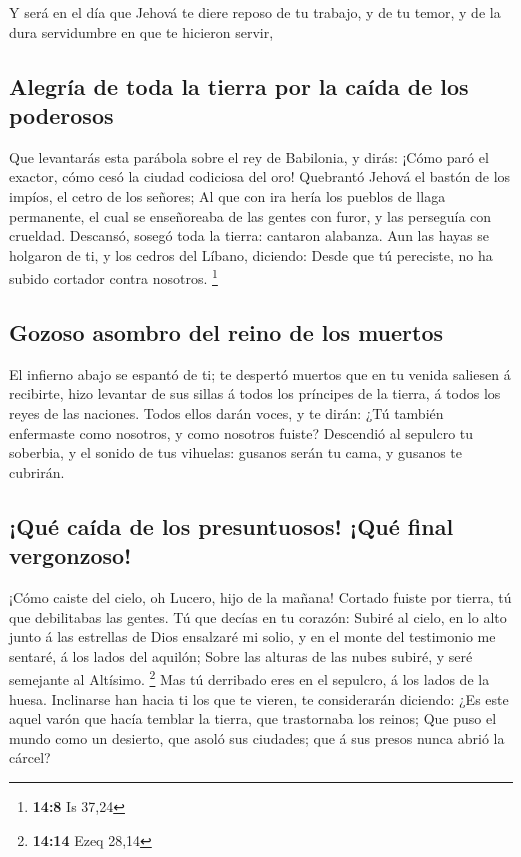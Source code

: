  Y será en el día que Jehová te diere reposo de tu trabajo,
y de tu temor, y de la dura servidumbre en que te hicieron servir,

\hypertarget{alegruxeda-de-toda-la-tierra-por-la-cauxedda-de-los-poderosos}{%
\subsection{Alegría de toda la tierra por la caída de los
poderosos}\label{alegruxeda-de-toda-la-tierra-por-la-cauxedda-de-los-poderosos}}

 Que levantarás esta parábola sobre el rey de Babilonia, y
dirás: ¡Cómo paró el exactor, cómo cesó la ciudad codiciosa del oro!
 Quebrantó Jehová el bastón de los impíos, el cetro de los
señores;  Al que con ira hería los pueblos de llaga
permanente, el cual se enseñoreaba de las gentes con furor, y las
perseguía con crueldad.  Descansó, sosegó toda la tierra:
cantaron alabanza.  Aun las hayas se holgaron de ti, y los
cedros del Líbano, diciendo: Desde que tú pereciste, no ha subido
cortador contra nosotros. \footnote{\textbf{14:8} Is 37,24}

\hypertarget{gozoso-asombro-del-reino-de-los-muertos}{%
\subsection{Gozoso asombro del reino de los
muertos}\label{gozoso-asombro-del-reino-de-los-muertos}}

 El infierno abajo se espantó de ti; te despertó muertos que
en tu venida saliesen á recibirte, hizo levantar de sus sillas á todos
los príncipes de la tierra, á todos los reyes de las naciones.
 Todos ellos darán voces, y te dirán: ¿Tú también
enfermaste como nosotros, y como nosotros fuiste? 
Descendió al sepulcro tu soberbia, y el sonido de tus vihuelas: gusanos
serán tu cama, y gusanos te cubrirán.

\hypertarget{quuxe9-cauxedda-de-los-presuntuosos-quuxe9-final-vergonzoso}{%
\subsection{¡Qué caída de los presuntuosos! ¡Qué final
vergonzoso!}\label{quuxe9-cauxedda-de-los-presuntuosos-quuxe9-final-vergonzoso}}

 ¡Cómo caiste del cielo, oh Lucero, hijo de la mañana!
Cortado fuiste por tierra, tú que debilitabas las gentes. 
Tú que decías en tu corazón: Subiré al cielo, en lo alto junto á las
estrellas de Dios ensalzaré mi solio, y en el monte del testimonio me
sentaré, á los lados del aquilón;  Sobre las alturas de las
nubes subiré, y seré semejante al Altísimo. \footnote{\textbf{14:14}
  Ezeq 28,14}  Mas tú derribado eres en el sepulcro, á los
lados de la huesa.  Inclinarse han hacia ti los que te
vieren, te considerarán diciendo: ¿Es este aquel varón que hacía temblar
la tierra, que trastornaba los reinos;  Que puso el mundo
como un desierto, que asoló sus ciudades; que á sus presos nunca abrió
la cárcel?

